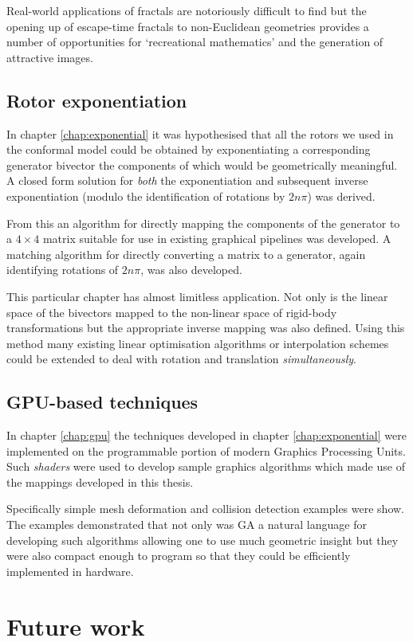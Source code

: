 Real-world applications of fractals are notoriously difficult to find but the
opening up of escape-time fractals to non-Euclidean geometries provides a
number of opportunities for `recreational mathematics' and the generation of
attractive images.

\subsection{Rotor exponentiation}

In chapter \ref{chap:exponential} it was hypothesised that all the rotors we
used in the conformal model could be obtained by exponentiating a corresponding
generator bivector the components of which would be geometrically meaningful.
A closed form solution for \emph{both} the exponentiation and subsequent
inverse exponentiation (modulo the identification of rotations by $2n\pi$) was
derived.

From this an algorithm for directly mapping the components of the generator
to a $4 \times 4$ matrix suitable for use in existing graphical pipelines
was developed. A matching algorithm for directly converting a matrix to
a generator, again identifying rotations of $2n\pi$, was also developed.

This particular chapter has almost limitless application. Not only is the
linear space of the bivectors mapped to the non-linear space of rigid-body
transformations but the appropriate inverse mapping was also defined. Using
this method many existing linear optimisation algorithms or interpolation
schemes could be extended to deal with rotation and translation
\emph{simultaneously}.

\subsection{GPU-based techniques}

In chapter \ref{chap:gpu} the techniques developed in chapter \ref{chap:exponential}
were implemented on the programmable portion of modern Graphics Processing
Units. Such \emph{shaders} were used to develop sample graphics algorithms which
made use of the mappings developed in this thesis. 

Specifically simple mesh deformation and collision detection examples were show.
The examples demonstrated that not only was GA a natural language for developing
such algorithms allowing one to use much geometric insight but they were also
compact enough to program so that they could be efficiently implemented in hardware.

\section{Future work}


